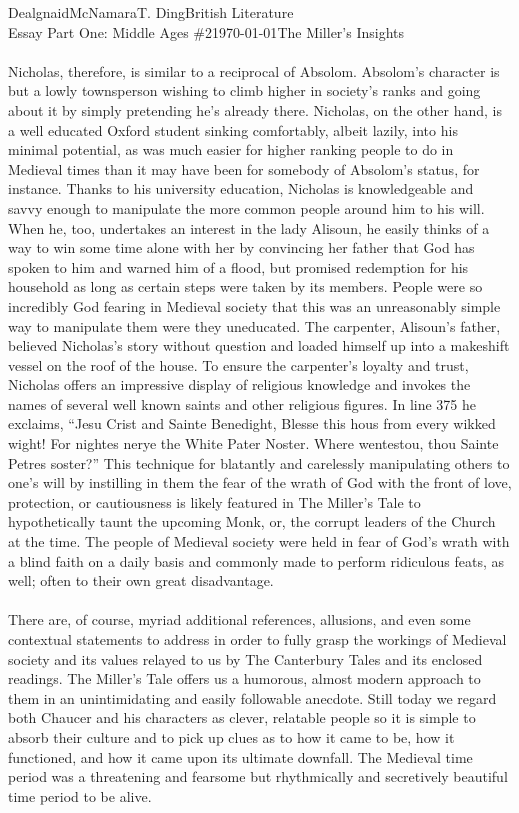\documentclass[12pt,letterpaper]{article}
\begin{document}
\begin{mla}{Dealgnaid}{McNamara}{T. Ding}{British Literature \\ Essay Part One: Middle Ages \#2}{\today}{The Miller's Insights}
\paragraph{}
	Nicholas, therefore, is similar to a reciprocal of Absolom. Absolom's character is but a lowly townsperson wishing to climb higher in society's ranks and going about it by simply pretending he's already there. Nicholas, on the other hand, is a well educated Oxford student sinking comfortably, albeit lazily, into his minimal potential, as was much easier for higher ranking people to do in Medieval times than it may have been for somebody of Absolom's status, for instance. Thanks to his university education, Nicholas is knowledgeable and savvy enough to manipulate the more common people around him to his will. When he, too, undertakes an interest in the lady Alisoun, he easily thinks of a way to win some time alone with her by convincing her father that God has spoken to him and warned him of a flood, but promised redemption for his household as long as certain steps were taken by its members. People were so incredibly God fearing in Medieval society that this was an unreasonably simple way to manipulate them were they uneducated. The carpenter, Alisoun's father, believed Nicholas's story without question and loaded himself up into a makeshift vessel on the roof of the house. To ensure the carpenter's loyalty and trust, Nicholas offers an impressive display of religious knowledge and invokes the names of several well known saints and other religious figures. In line 375 he exclaims, “Jesu Crist and Sainte Benedight, Blesse this hous from every wikked wight! For nightes nerye the White Pater Noster. Where wentestou, thou Sainte Petres soster?” This technique for blatantly and carelessly manipulating others to one's will by instilling in them the fear of the wrath of God with the front of love, protection, or cautiousness is likely featured in The Miller's Tale to hypothetically  taunt the upcoming Monk, or, the corrupt leaders of the Church at the time. The people of Medieval society were held in fear of God's wrath with a blind faith on a daily basis and commonly made to perform ridiculous feats, as well; often to their own great disadvantage.
\paragraph{}
	There are, of course, myriad additional references, allusions, and even some contextual statements to address in order to fully grasp the workings of Medieval society and its values relayed to us by The Canterbury Tales and its enclosed readings. The Miller's Tale offers us a humorous, almost modern approach to them in an unintimidating and easily followable anecdote. Still today we regard both Chaucer and his characters as clever, relatable people so it is simple to absorb their culture and to pick up clues as to how it came to be, how it functioned, and how it came upon its ultimate downfall. The Medieval time period was a threatening and fearsome but rhythmically and secretively beautiful time period to be alive.

\end{mla}
\end{document}
